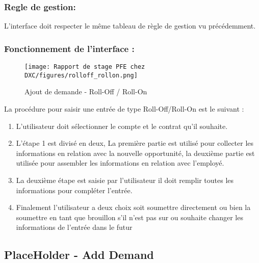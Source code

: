 \subsubsection{Regle de gestion:}

L’interface doit respecter le même tableau de règle de gestion vu précédemment.

\subsubsection{Fonctionnement de l'interface :}

\begin{figure}[H]
    \centering
    \texttt{[image: Rapport de stage PFE chez DXC/figures/rolloff\_rollon.png]}
    \caption{Ajout de demande - Roll-Off / Roll-On}
\end{figure}

La procédure pour saisir une entrée de type Roll-Off/Roll-On est le suivant :

\begin{enumerate}
    
    \item L'utilisateur doit sélectionner le compte et le contrat qu'il souhaite.
    \vspace{0.1cm}
    \item L'étape 1 est divisé en deux, La première partie est utilisé pour collecter les informations en relation avec la nouvelle opportunité, la deuxième partie est utilisée pour assembler les informations en relation avec l'employé.
    \vspace{0.1cm}
    \item La deuxième étape est saisie par l'utilisateur il doit remplir toutes les informations pour compléter l'entrée.
    \vspace{0.1cm}
    \item Finalement l'utilisateur a deux choix soit soumettre directement ou bien la soumettre en tant que brouillon s'il n'est pas sur ou souhaite changer les informations de l'entrée dans le futur

\end{enumerate}


\subsection{PlaceHolder - Add Demand}

